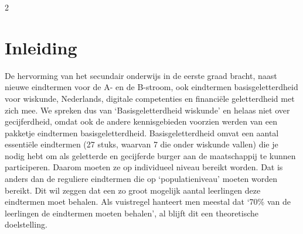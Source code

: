 

\startcontents[inhoudloep]	%

\begin{multicols}{2}
	
	\inhoudstafelloep			%
	
\section{Inleiding}
De hervorming van het secundair onderwijs in de eerste graad bracht, naast nieuwe eindtermen voor de A- en de B-stroom, ook eindtermen basisgeletterdheid voor wiskunde, Nederlands, digitale competenties en financiële geletterdheid met zich mee. We spreken dus van `Basisgeletterdheid wiskunde' en helaas niet over gecijferdheid, omdat ook de andere kennisgebieden voorzien werden van een pakketje eindtermen basisgeletterdheid. Basisgeletterdheid omvat een aantal essentiële eindtermen (27 stuks, waarvan 7 die onder wiskunde vallen) die je nodig hebt om als geletterde en gecijferde burger aan de maatschappij te kunnen participeren. Daarom moeten ze op individueel niveau bereikt worden. Dat is anders dan de reguliere eindtermen die op `populatieniveau' moeten worden bereikt. Dit wil zeggen dat een zo groot mogelijk aantal leerlingen deze eindtermen moet behalen. Als vuistregel hanteert men meestal dat `70\% van de leerlingen de eindtermen moeten behalen', al blijft dit een theoretische doelstelling.


\end{multicols}
